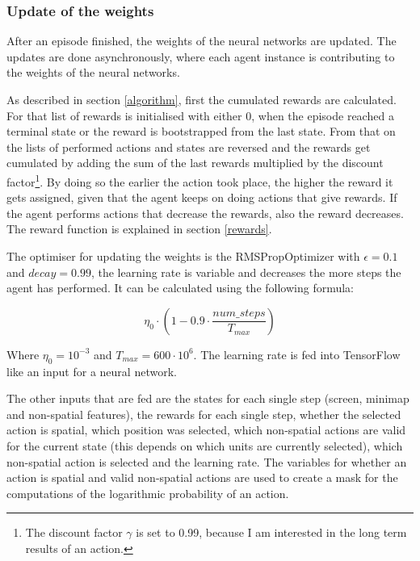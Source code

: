 \documentclass{article}
\begin{document}
\subsubsection{Update of the weights}
After an episode finished, the weights of the neural networks are updated. The 
updates are done asynchronously, where each agent instance is contributing to 
the weights of the neural networks.

As described in section \ref{algorithm}, first the cumulated rewards are 
calculated. For that list of rewards is initialised with either 0, when the 
episode reached a terminal state or the reward is bootstrapped from the last 
state. From that on the lists of performed actions and states are reversed and 
the rewards get cumulated by adding the sum of the last rewards multiplied by 
the discount factor\footnote{The discount factor $\gamma$ is set to 0.99, 
because I am interested in the long term results of an action.}. By doing so 
the earlier the action took place, the higher the reward it gets assigned, 
given that the agent keeps on doing actions that give rewards. If the agent 
performs actions that decrease the rewards, also the reward decreases. The 
reward function is explained in section \ref{rewards}.

The optimiser for updating the weights is the RMSPropOptimizer 
\cite{Hinton2014} with $\epsilon = 0.1$ and $decay = 0.99$, the learning rate 
is variable and decreases the more steps the agent has performed. It can be 
calculated using the following formula:

\begin{equation}
\eta_0 \cdot \left(1 - 0.9 \cdot 
\frac{num\_steps}{T_{max}}\right)
\end{equation}

Where $\eta_0 = 10^{-3}$ and $T_{max} = 600 \cdot 10^6$.  The learning rate is 
fed into TensorFlow like an input for a neural network.

The other inputs that are fed are the states for each single step (screen, 
minimap and non-spatial features), the rewards for each single step, whether 
the selected action is spatial, which position was selected, which non-spatial 
actions are valid for the current state (this depends on which units 
are currently selected), which non-spatial action is selected and the learning 
rate. The variables for whether an action is spatial and valid non-spatial 
actions are used to create a mask for the computations of the logarithmic 
probability of an action.
\end{document}
